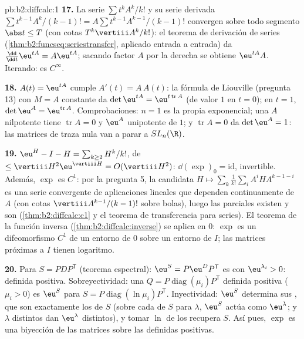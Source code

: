 \begin{solution}{pb:b2:diffcalc:1}
\textbf{17.} La serie $\sum t^kA^k/k!$ y su serie derivada $\sum
t^{k-1}A^k/(k-1)! = A\sum t^{k-1}A^{k-1}/(k-1)!$ convergen
 sobre todo segmento $\abs t \leq T$ (con cotas
$T^k\vertiii A^k/k!$): el teorema de derivación de series
(\cref{thm:b2:funcseq:seriestransfer}, aplicado entrada a entrada) da
$\frac{\dd}{\dd t}\eu^{tA} = A\eu^{tA}$; sacando factor $A$ por la
derecha se obtiene $\eu^{tA}A$. Iterando: es $C^\infty$.

\textbf{18.} $A(t) = \eu^{tA}$ cumple $A'(t) = A\,A(t)$: la fórmula
de Liouville (pregunta 13) con $M = A$ constante da $\det\eu^{tA} =
\eu^{t\operatorname{tr}A}$ (de valor $1$ en $t = 0$); en $t = 1$,
$\det\eu^A = \eu^{\operatorname{tr}A}$. Comprobaciones: $n = 1$ es la
propia exponencial; una $A$ nilpotente tiene $\operatorname{tr}A = 0$
y $\eu^A$ unipotente de  $1$; y $\operatorname{tr}A = 0$ da
$\det\eu^A = 1$: las matrices de traza nula van a parar a
$SL_n(\R)$.

\textbf{19.} $\eu^H - I - H = \sum_{k\geq2}H^k/k!$, de  $\leq
\vertiii H^2\eu^{\vertiii H} = O(\vertiii H^2)$: $\dd(\exp)_0 =
\mathrm{id}$, invertible. Además, $\exp$ es $C^1$: por la pregunta 5,
la  candidata $H \mapsto
\sum_k\frac1{k!}\sum_iA^iHA^{k-1-i}$ es una serie 
convergente de aplicaciones lineales que dependen continuamente de $A$
(con cotas $\vertiii A^{k-1}/(k-1)!$ sobre bolas), luego las
parciales existen y son  (\cref{thm:b2:diffcalc:c1} y el
teorema de transferencia para series). El teorema de la función
inversa (\cref{thm:b2:diffcalc:inverse}) se aplica en $0$: $\exp$ es
un difeomorfismo $C^1$ de un entorno de $0$ sobre un entorno de $I$;
las matrices próximas a $I$ tienen logaritmo.

\textbf{20.} Para $S = PDP^{\mathsf T}$  (teorema espectral):
$\eu^S = P\eu^DP^{\mathsf T}$ es  con 
$\eu^{\lambda_i} > 0$: definida positiva. Sobreyectividad: una $Q =
P\operatorname{diag}(\mu_i)P^{\mathsf T}$ definida positiva ($\mu_i >
0$) es $\eu^S$ para $S = P\operatorname{diag}(\ln\mu_i)P^{\mathsf
T}$. Inyectividad: $\eu^S$ determina sus , que son
exactamente los de $S$ (sobre cada  de $S$ para
$\lambda$, $\eu^S$ actúa como $\eu^\lambda$; y $\lambda$ distintos
dan $\eu^\lambda$ distintos), y tomar $\ln$ de los 
recupera $S$. Así pues, $\exp$ es una biyección de las matrices
 sobre las definidas positivas.


\end{solution}
